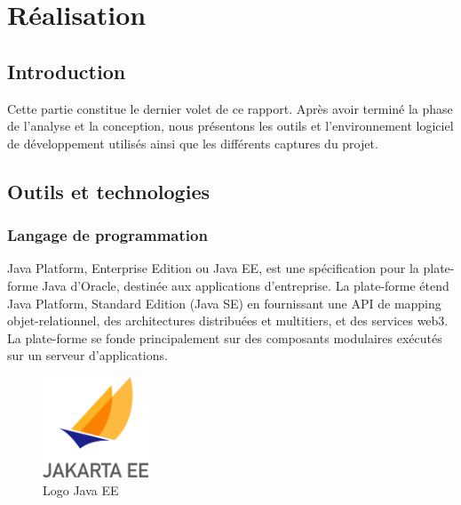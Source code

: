 \chapter{Réalisation}


\section{Introduction}
Cette partie constitue le dernier volet de ce rapport. Après avoir terminé la phase de l'analyse et la conception, nous présentons les outils et l’environnement logiciel de développement utilisés ainsi que les différents captures du projet.\\
\section{Outils et technologies}
\subsection{Langage de programmation}
Java Platform, Enterprise Edition ou Java EE, est une spécification pour la plate-forme Java d'Oracle, destinée aux applications d'entreprise.
La plate-forme étend Java Platform, Standard Edition (Java SE) en fournissant une API de mapping objet-relationnel, des architectures distribuées et multitiers, et des services web3. La plate-forme se fonde principalement sur des composants modulaires exécutés sur un serveur d'applications.\\
\begin{figure}[!h]
\begin{center}
\includegraphics[height=3cm]{Pictures/jee.png}
\end{center}
\caption{Logo Java EE}
\end{figure}

